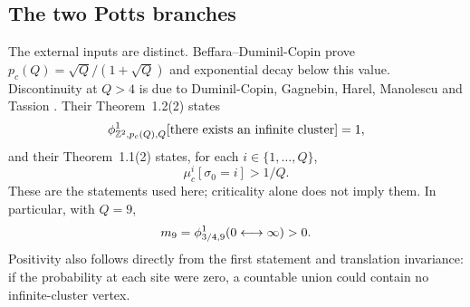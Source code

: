 \subsection{The two Potts branches}\label{sec:potts-branches}
The external inputs are distinct. Beffara--Duminil-Copin \cite[Theorems 1 and 2]{BDC} prove $p_c(Q)=\sqrt Q/(1+\sqrt Q)$ and exponential decay below this value. Discontinuity at $Q>4$ is due to Duminil-Copin, Gagnebin, Harel, Manolescu and Tassion \cite{DGHMT}. Their Theorem~1.2(2) states
\[
 \phi^1_{\mathbb Z^2,p_c(Q),Q}
 [\text{there exists an infinite cluster}]=1,
\]
and their Theorem~1.1(2) states, for each $i\in\{1,\ldots,Q\}$,
\[
 \mu^i_c[\sigma_0=i]>1/Q.
\]
These are the statements used here; criticality alone does not imply them. In particular, with $Q=9$,
\begin{equation}\label{eq:m9}
 m_9=\phi^1_{3/4,9}(0\longleftrightarrow\infty)>0.
\end{equation}
Positivity also follows directly from the first statement and translation invariance: if the probability at each site were zero, a countable union could contain no infinite-cluster vertex.

